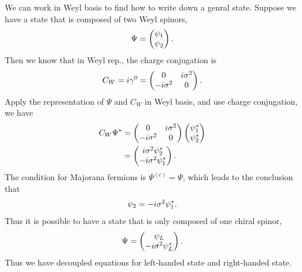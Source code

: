 \documentclass[letterpaper,12pt,english]{sphinxmanual}
\begin{document}
We can work in Weyl basis to find how to write down a genral state. Suppose we have a state that is composed of two Weyl spinors,
\begin{gather}
\begin{split}\Psi = \begin{pmatrix} \psi_1 \\ \psi_2 \end{pmatrix}.\end{split}\notag
\end{gather}
Then we know that in Weyl rep., the charge conjugation is
\begin{gather}
\begin{split}C_{W} = i\gamma^0 = \begin{pmatrix} 0 & i\sigma^2 \\  -i\sigma^2 & 0  \end{pmatrix}.\end{split}\notag
\end{gather}
Apply the representation of \(\Psi\) and \(C_{W}\) in Weyl basis, and use charge conjugation, we have
\begin{gather}
\begin{split}C_W\Psi^* &=  \begin{pmatrix} 0 & i\sigma^2 \\  -i\sigma^2 & 0  \end{pmatrix} \begin{pmatrix} \psi_1^* \\ \psi_2^* \end{pmatrix} \\
& = \begin{pmatrix} i\sigma^2\psi_2^* \\ -i\sigma^2 \psi_1^* \end{pmatrix}.\end{split}\notag
\end{gather}
The condition for Majorana fermions is \(\Psi^{(c)} = \Psi\), which leads to the conclusion that
\begin{gather}
\begin{split}\psi_2 = -i\sigma^2\psi_1^*.\end{split}\notag
\end{gather}
Thus it is possible to have a state that is only composed of one chiral spinor,
\begin{gather}
\begin{split}\Psi = \begin{pmatrix} \psi_L \\ -i\sigma^2 \psi_L^* \end{pmatrix}.\end{split}\notag
\end{gather}
Thus we have decoupled equations for left-handed state and right-handed state.
\end{document}
